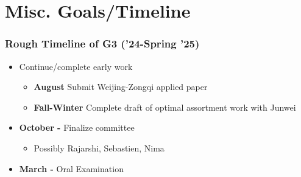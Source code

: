\documentclass{beamer}
\begin{document}
    

    \section{Misc. Goals/Timeline}

    \begin{frame}[allowframebreaks]
    \frametitle{\large{Rough Timeline of G3 ('24-Spring '25)}}

        \begin{itemize}\setlength\itemsep{1em}
            \item Continue/complete early work 
            \begin{itemize}
            \item \textbf{August} Submit Weijing-Zongqi applied paper 
            \item \textbf{Fall-Winter} Complete draft of optimal assortment work with Junwei
            \end{itemize}
            \item \textbf{October -} Finalize committee 
            \begin{itemize}
                \item Possibly Rajarshi, Sebastien, Nima 
            \end{itemize}
            \item \textbf{March -}  Oral Examination
        \end{itemize}
    \end{frame}
\end{document}
